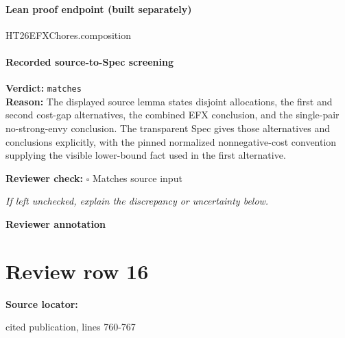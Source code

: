 \documentclass[10pt]{article}
\newcommand{\reviewerbox}{%
  \par\noindent\fbox{\parbox{0.96\linewidth}{\rule{0pt}{0.38in}}}\par
}
\newcommand{\reviewmatch}[1]{%
  \par\noindent\textbf{Reviewer check:} $\square$\; #1\par
  \noindent\emph{If left unchecked, explain the discrepancy or uncertainty below.}\par
}
\begin{document}
\paragraph{Lean proof endpoint (built separately)}\begin{ReviewVerbatim}
HT26EFXChores.composition
\end{ReviewVerbatim}

\paragraph{Recorded source-to-Spec screening}
\textbf{Verdict:} \texttt{matches}
\\
\textbf{Reason:} The displayed source lemma states disjoint allocations, the first and second cost-gap alternatives, the combined EFX conclusion, and the single-pair no-strong-envy conclusion. The transparent Spec gives those alternatives and conclusions explicitly, with the pinned normalized nonnegative-cost convention supplying the visible lower-bound fact used in the first alternative.
\reviewmatch{Matches source input}
\noindent\textbf{Reviewer annotation}\par
\reviewerbox
\clearpage
\hypertarget{source-claim-1b77c29da35b62c2}{}
\section*{Review row 16}
\textbf{Source locator:} {\footnotesize\raggedright cited publication, lines 760-\allowbreak{}767\par}
\end{document}
